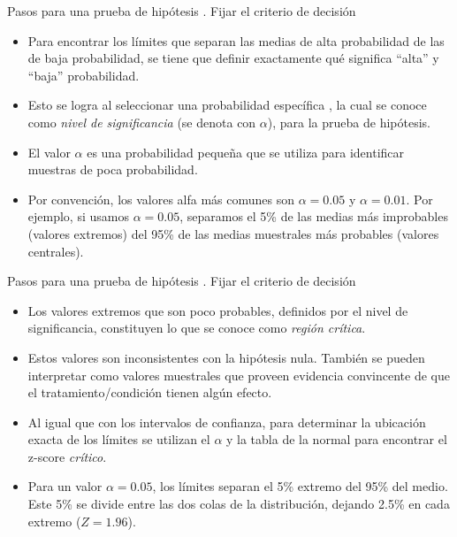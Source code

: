 \documentclass{beamer}
\begin{document}
\begin{frame}{Pasos para una prueba de hipótesis}
	{. Fijar el criterio de decisión}
\begin{itemize}
\justifying
\item Para encontrar los límites que separan las medias de alta probabilidad de las de baja probabilidad, se tiene que definir exactamente qué significa ``alta'' y ``baja'' probabilidad.
\item Esto se logra al seleccionar una probabilidad específica , la cual se conoce como \emph{nivel de significancia} (se denota con $\alpha$), para la prueba de hipótesis.
\item El valor $\alpha$ es una probabilidad pequeña que se utiliza para identificar muestras de poca probabilidad.
\item Por convención, los valores alfa más comunes son $\alpha=0.05$ y $\alpha=0.01$. Por ejemplo, si usamos $\alpha=0.05$, separamos el 5\% de las medias más improbables (valores extremos) del 95\% de las medias muestrales más probables (valores centrales).
\end{itemize}
\end{frame}

\begin{frame}{Pasos para una prueba de hipótesis}
	{. Fijar el criterio de decisión}
	\begin{itemize}
		\justifying
	\item Los valores extremos que son poco probables, definidos por el nivel de significancia, constituyen lo que se conoce como \emph{región crítica}.
	\item Estos valores son inconsistentes con la hipótesis nula. También se pueden interpretar como valores muestrales que proveen evidencia convincente de que el tratamiento/condición tienen algún efecto.
	\item Al igual que con los intervalos de confianza, para determinar la ubicación exacta de los límites se utilizan el $\alpha$ y la tabla de la normal para encontrar el z-score \emph{crítico}.
	\item Para un valor $\alpha=0.05$, los límites separan el 5\% extremo del 95\% del medio. Este 5\% se divide entre las dos colas de la distribución, dejando 2.5\% en cada extremo ($Z=1.96$).
	\end{itemize}
\end{frame}
\end{document}
